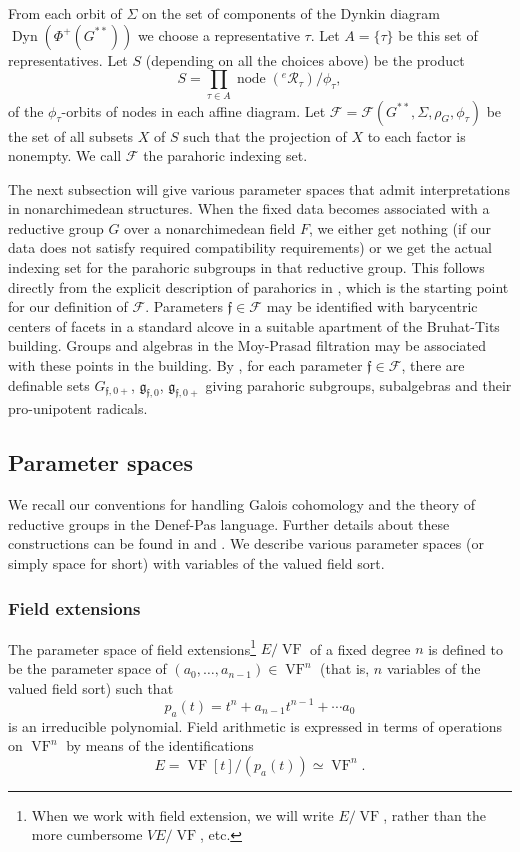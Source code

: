 \documentclass[12pt]{amsart}
\newcommand{\op}[1]{\operatorname{#1}}
\newcommand{\cal}[1]{\mathcal{#1}}
\def\VF{{\op{VF}}}
\def\R{\cal{R}}
\def\s{{\mathfrak{f}}}
\newcommand{\cF}{\mathcal{F}}
\newcommand{\fg}{\mathfrak{g}}
\theoremstyle{plain}
\theoremstyle{definition}
\begin{document}
From each orbit of $\Sigma$ on the set of components of the Dynkin
diagram $\op{Dyn}(\Phi^+(G^{**}))$ we choose a representative
$\tau$.  Let $A = \{\tau\}$ be this set of representatives.  Let
$S$ (depending on all the choices above) be the product
\[
S = \prod_{\tau\in A} \op{node}({}^e\R_\tau)/\phi_\tau,
\]
of the $\phi_\tau$-orbits of nodes in each affine diagram.  Let $\cF
= \cF(G^{**},\Sigma,\rho_G,\phi_\tau)$ be the set of all
subsets $X$ of $S$ such that the projection of $X$ to each factor is
nonempty.  We call $\cF$ the parahoric indexing set.

The next subsection will give various parameter spaces that admit
interpretations in nonarchimedean structures.  When the fixed data
becomes associated with a reductive group $G$ over a nonarchimedean
field $F$, we either get nothing (if our data does not satisfy
required compatibility requirements) or we get the actual indexing set
for the parahoric subgroups in that reductive group.  This follows
directly from the explicit description of parahorics in \cite{Gross},
which is the starting point for our definition of $\cF$.  Parameters
$\s\in \cF$ may be identified with barycentric centers of facets in a
standard alcove in a suitable apartment of the Bruhat-Tits building.
Groups and algebras in the Moy-Prasad filtration may be associated
with these points in the building.  By \cite{CGH}, for each parameter
$\s\in \cF$, there are definable sets $G_{\s,0+}$,
$\fg_{\s,0}$, $\fg_{\s,0+}$ giving parahoric subgroups, subalgebras
and their pro-unipotent radicals.


\subsection{Parameter spaces}

We recall our conventions for handling Galois cohomology and the
theory of reductive groups in the Denef-Pas language.  Further details
about these constructions can be found in \cite{CHL} and \cite{CGH}.
We describe
various parameter spaces (or simply space for short) with variables of
the valued field sort.  


\subsubsection{Field extensions}

The parameter space of field extensions\footnote{When we work with
  field extension, we will write $E/\VF$, rather than the more
  cumbersome $VE/\VF$, etc.} $E/\VF$ of a fixed degree $n$ is defined
to be the parameter space of $(a_0,\ldots,a_{n-1})\in \VF^n$ (that is,
$n$ variables of the valued field sort) such that
\[
p_a(t) = t^n + a_{n-1} t^{n-1} + \cdots a_0
\]
is an irreducible polynomial.  Field arithmetic is expressed in terms
of operations on $\VF^n$ by means of the identifications
\[
E = \VF[t]/(p_a(t)) \simeq \VF^n.
\]
\end{document}
